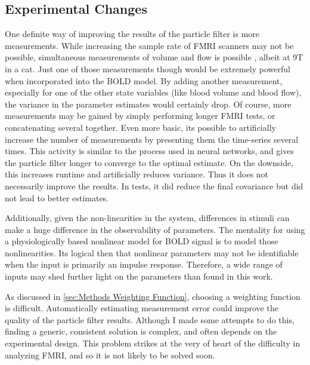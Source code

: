 \subsection{Experimental Changes}
\label{sec:Sideways Measurements}
One definite way of improving the results of the particle filter is more 
measurements. While increasing the sample rate of FMRI scanners may
not be possible, simultaneous measurements of volume and flow is
possible \cite{Hu2009}, albeit at 9T in a cat. Just one of those measurements
though would be extremely powerful when incorporated into the BOLD
model. By adding another measurement, especially for one of the other state
variables (like blood volume and blood flow), the
variance in the parameter estimates would certainly drop. Of course, more measurements
may be gained by simply performing longer FMRI tests, or concatenating several 
together. Even more basic, its possible to artificially increase the number of 
measurements by presenting them the time-series several times. 
This activity is similar to the process used in neural networks,
and gives the particle filter longer to converge to the optimal estimate. On the 
downside, this increases runtime and artificially reduces variance. 
Thus it does not necessarily improve the results. In tests, it did reduce the
final covariance but did not lead to better estimates. 

Additionally, given the non-linearities in the system, differences in stimuli
can make a huge difference in the observability of parameters. The mentality 
for using a physiologically based nonlinear model for BOLD signal is to model 
those nonlinearities. Its logical then that nonlinear parameters may not
be identifiable when the input is primarily an impulse response. Therefore,
a wide range of inputs may shed further light on the parameters than found 
in this work.

As discussed in \autoref{sec:Methods Weighting Function}, choosing a weighting
function is difficult. Automatically estimating measurement error could improve
the quality of the particle filter results. Although I made some attempts to do
this, finding a generic, consistent solution is complex, and often depends on the
experimental design. This problem strikes at the very of heart of the difficulty
in analyzing FMRI, and so it is not likely to be solved soon. 

